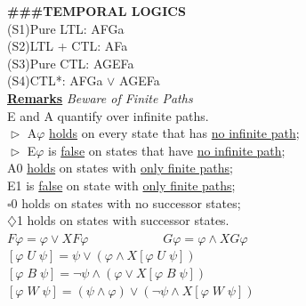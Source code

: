 \documentclass{article}
\begin{document}
\begin{multicols}{4}
\textbf{\#\#\#TEMPORAL LOGICS} \\
(S1)Pure LTL: AFGa \\
(S2)LTL + CTL: AFa \\
(S3)Pure CTL: AGEFa \\
(S4)CTL*: AFGa $\vee$ AGEFa \\
\textbf{\underline{Remarks}}
\textit{Beware of Finite Paths}\\
E and A quantify over infinite paths.\\
$\vartriangleright$ A$\varphi$ \underline{holds} on every state that has \underline{no infinite path};\\
$\vartriangleright$ E$\varphi$ is \underline{false} on states that have \underline{no infinite path};\\
A0 \underline{holds} on states with \underline{only finite paths};\\
E1 is \underline{false} on state with \underline{only finite paths};\\
$\square$0 holds on states with no successor states;\\
$\diamondsuit$1 holds on states with successor states.\\
$F\varphi = \varphi \vee X F\varphi\qquad\qquad\qquad G\varphi = \varphi \wedge XG \varphi$\\
$[ \varphi \; U\; \psi ] = \psi \vee (\varphi\wedge X[ \varphi \; U\; \psi])$\\
$[ \varphi \; B\; \psi ] = \neg \psi \wedge (\varphi \vee X[ \varphi \; B\; \psi])$\\
$[ \varphi \; W\; \psi] = (\psi \wedge \varphi) \vee (\neg \psi \wedge X[\varphi \; W \; \psi])$


\end{multicols}
\end{document}
